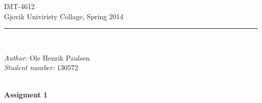 \documentclass[a4paper,12pt,pdftex]{article}
\newcommand{\HRule}{\rule{\linewidth}{0.2mm}}
\def\name{Ole Henrik Paulsen}
\def\studentnumber{130572}
\def\course{IMT-4612}
\def\school{Gjovik Univiristy Collage}
\def\reportname{Assigment 1}
\def\semester{Spring 2014}
\begin{document}
\begin{titlepage}                                                               
    \begin{center}                                                                                                   
                                                                                
        \large \course\\                                                        
        \large \school, \semester\\[0.4cm]                                       
        \HRule\\[1.5cm]                                                         
                                                                                
        \begin{minipage}{0.4\textwidth}                                         
            \begin{flushleft}                                                   
                \small \emph{Author:} \name\\                                  
                \small \emph{Student number:} \studentnumber\\                  
            \end{flushleft}                                                     
        \end{minipage}                                                          
                                                                                
        \ \\[7.0cm]                                                             
        \LARGE\textbf{\reportname}                                              
                                                                                
    \end{center}                                                                
    \thispagestyle{titlefooter}                                                 
\end{titlepage}                                                                 
                                                                                
\tableofcontents                                                                
\clearpage   
\end{document}
